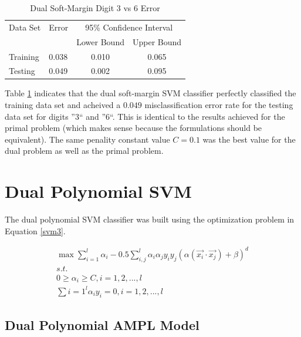 \documentclass{article}
\begin{document}
\begin{table}\label{table2}
\caption{Dual Soft-Margin Digit 3 vs 6 Error}
\begin{center}
\begin{tabular}{llcc}
\toprule
Data Set & Error & \multicolumn{2}{c}{95\% Confidence Interval} \\
\cmidrule(r){3-4}
& & Lower Bound & Upper Bound \\
\midrule
Training & 0.038 & 0.010 & 0.065 \\
Testing & 0.049 & 0.002 & 0.095 \\
\bottomrule
\end{tabular}
\end{center}
\end{table}

Table \ref{table2} indicates that the dual soft-margin SVM classifier perfectly classified the training data set and acheived a \(0.049\) misclassification error rate for the testing data set for digits ''3`` and ''6``. This is identical to the results achieved for the primal problem (which makes sense because the formulations should be equivalent). The same penality constant value \(C=0.1\) was the best value for the dual problem as well as the primal problem.

\section{Dual Polynomial SVM}\label{model3}

The dual polynomial SVM classifier was built using the optimization problem in Equation \ref{svm3}.

\begin{equation}\label{svm3}
\begin{split}
\max \sum_{i=1}^l \alpha_i - 0.5 \sum_{i,j}^l \alpha_i \alpha_j y_i y_j \left( \alpha \left( \vec{x_i} \cdot \vec{x_j} \right) + \beta \right)^d \\
s.t. \\
0 \ge \alpha_i \ge C , i = 1,2,...,l \\
\sum{i=1}^l \alpha_i y_i = 0 , i = 1,2,...,l
\end{split}
\end{equation}

\subsection{Dual Polynomial AMPL Model}
\end{document}
